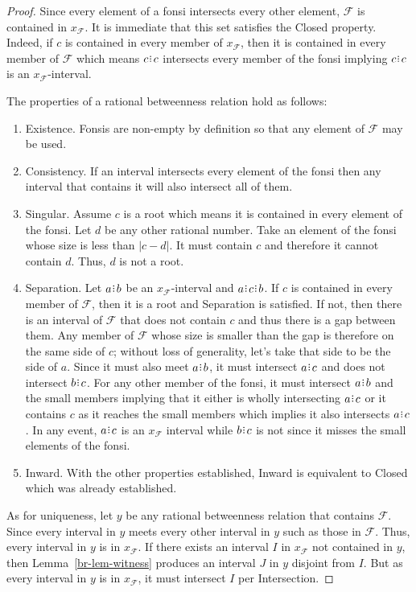 \documentclass[12pt]{article}
\begin{document}
\begin{proof}
    Since every element of a fonsi intersects every other element, $\mathcal{F}$ is contained in $x_{\mathcal{F}}$. It is immediate that this set satisfies the Closed property. Indeed, if $c$ is contained in every member of $x_{\mathcal{F}}$, then it is contained in every member of $\mathcal{F}$ which means $c \rint c$ intersects every member of the fonsi implying $c\rint c$ is an  $x_{\mathcal{F}}$-interval.
    
    
    The properties of a rational betweenness relation hold as follows: 
    \begin{enumerate}
        \item Existence. Fonsis are non-empty by definition so that any element of $\mathcal{F}$ may be used. 
        
        \item Consistency. If an interval intersects every element of the fonsi then any interval that contains it will also intersect all of them. 
        
        \item Singular. Assume $c$ is a root which means it is contained in every element of the fonsi. Let $d$ be any other rational number. Take an element of the fonsi whose size is less than $|c-d|$. It must contain $c$ and therefore it cannot contain $d$. Thus, $d$ is not a root. 
        
        \item Separation. Let $a \rint b $ be an  $x_{\mathcal{F}}$-interval and $a \rint c \rint b$. If $c$ is contained in every member of $\mathcal{F}$, then it is a root and Separation is satisfied. If not, then there is an interval of $\mathcal{F}$ that does not contain $c$ and thus there is a gap between them. Any member of $\mathcal{F}$ whose size is smaller than the gap is therefore on the same side of $c$; without loss of generality, let's take that side to be the side of $a$. Since it must also meet $a\rint b$, it must intersect $a \rint c$ and does not intersect $b \rint c$. For any other member of the fonsi, it must intersect $a \rint b$ and the small members implying that it either is wholly intersecting $a \rint c$ or it contains $c$ as it reaches the small members which implies it also intersects $a \rint c$. In any event, $a \rint c$ is an $x_\mathcal{F}$ interval while $b \rint c$ is not since it misses the small elements of the fonsi. 
        
        \item Inward. With the other properties established, Inward is equivalent to Closed which was already established. 
    \end{enumerate}

    As for uniqueness, let $y$ be any rational betweenness relation that contains $\mathcal{F}$. Since every interval in $y$ meets every other interval in $y$ such as those in $\mathcal{F}$. Thus, every interval in $y$ is in $x_{\mathcal{F}}$. If there exists an interval $I$ in $x_{\mathcal{F}}$ not contained in $y$, then Lemma~\ref{br-lem-witness} produces an interval $J$ in $y$ disjoint from $I$. But as every interval in $y$ is in $x_{\mathcal{F}}$, it must intersect $I$ per Intersection.
\end{proof}
\end{document}
